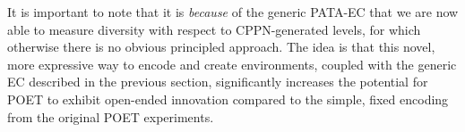 \documentclass{article}
\newcommand{\removed}[1]{\comments{\textcolor{gray}{\sout{#1}}}}
\newcommand{\comments}[1]{#1} %
\begin{document}
It is important to note that it is \emph{because} of the generic PATA-EC that we are now able to measure diversity with respect to CPPN-generated levels, for which otherwise there is no obvious principled approach.
The idea is that this novel, more expressive way to encode and create environments, coupled with the generic EC described in the previous section, significantly increases the potential for POET to exhibit open-ended innovation compared to the simple, fixed encoding from the original POET experiments. 


\end{document}
